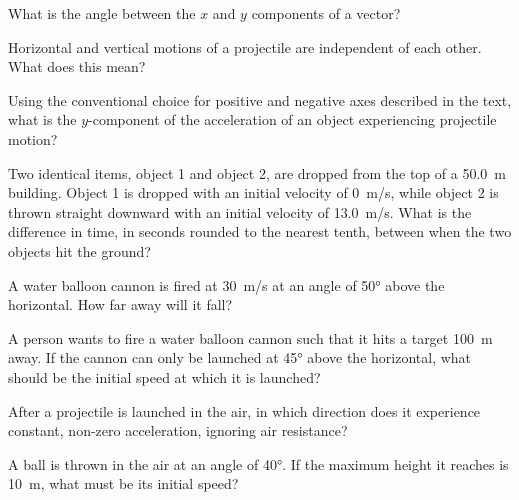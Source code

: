 \documentclass[main.tex]{subfiles}
\begin{document}
\begin{exercise} \label{90PABl}
    What is the angle between the $x$ and $y$ components of a vector?
\end{exercise}

\begin{exercise}
    Horizontal and vertical motions of a projectile are independent of each other. What does this mean?
\end{exercise}

\begin{exercise} \label{YYBBp5}
    Using the conventional choice for positive and negative axes described in the text, what is the $y$-component of the acceleration of an object experiencing projectile motion?
\end{exercise}

\begin{exercise}  \label{agp59Z}
    Two identical items, object 1 and object 2, are dropped from the top of a \SI{50.0}{m} building. Object 1 is dropped with an initial velocity of \SI{0}{m/s}, while object 2 is thrown straight downward with an initial velocity of \SI{13.0}{m/s}. What is the difference in time, in seconds rounded to the nearest tenth, between when the two objects hit the ground?
\end{exercise}

\begin{exercise} \label{Xu3FK9}
    A water balloon cannon is fired at \SI{30}{m/s} at an angle of \ang{50} above the horizontal. How far away will it fall?
\end{exercise}

\begin{exercise} \label{piJ9kJ}
    A person wants to fire a water balloon cannon such that it hits a target \SI{100}{m} away. If the cannon can only be launched at \ang{45} above the horizontal, what should be the initial speed at which it is launched?
\end{exercise}

\begin{exercise} \label{sy5RGT}
    After a projectile is launched in the air, in which direction does it experience constant, non-zero acceleration, ignoring air resistance?
\end{exercise}

\begin{exercise} \label{N0Bwou}
    A ball is thrown in the air at an angle of \ang{40}. If the maximum height it reaches is \SI{10}{m}, what must be its initial speed?
\end{exercise}
\end{document}
